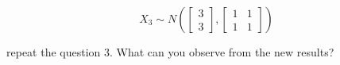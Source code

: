 \begin{enumerate}
    \begin{equation*}
        X_3 \sim N\left( \begin{bmatrix} 3 \\ 3 \end{bmatrix}, \begin{bmatrix} 1 & 1 \\ 1 & 1 \end{bmatrix} \right)
    \end{equation*}
    
    \noindent repeat the question 3. What can you observe from the new results?
    
\end{enumerate}





